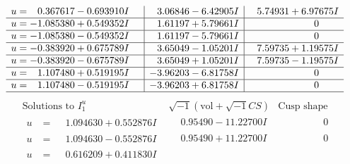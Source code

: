 \documentclass[1p]{elsarticle_modified}
\theoremstyle{definition}
\newcommand{\I}{\sqrt{-1}}
\begin{document}
$$\begin{array}{c|c|c}
\begin{aligned}
u &= \phantom{-}0.367617 - 0.693910 I\end{aligned}
 & \phantom{-}3.06846 - 6.42905 I & \phantom{-}5.74931 + 6.97675 I \\ \hline\begin{aligned}
u &= -1.085380 + 0.549352 I\end{aligned}
 & \phantom{-}1.61197 + 5.79661 I & \phantom{-0.000000 } 0 \\ \hline\begin{aligned}
u &= -1.085380 - 0.549352 I\end{aligned}
 & \phantom{-}1.61197 - 5.79661 I & \phantom{-0.000000 } 0 \\ \hline\begin{aligned}
u &= -0.383920 + 0.675789 I\end{aligned}
 & \phantom{-}3.65049 - 1.05201 I & \phantom{-}7.59735 + 1.19575 I \\ \hline\begin{aligned}
u &= -0.383920 - 0.675789 I\end{aligned}
 & \phantom{-}3.65049 + 1.05201 I & \phantom{-}7.59735 - 1.19575 I \\ \hline\begin{aligned}
u &= \phantom{-}1.107480 + 0.519195 I\end{aligned}
 & -3.96203 - 6.81758 I & \phantom{-0.000000 } 0 \\ \hline\begin{aligned}
u &= \phantom{-}1.107480 - 0.519195 I\end{aligned}
 & -3.96203 + 6.81758 I & \phantom{-0.000000 } 0\\
 \hline 
 \end{array}$$\newpage$$\begin{array}{c|c|c}  
\text{Solutions to }I^u_{1}& \I (\text{vol} + \sqrt{-1}CS) & \text{Cusp shape}\\
 \hline 
\begin{aligned}
u &= \phantom{-}1.094630 + 0.552876 I\end{aligned}
 & \phantom{-}0.95490 - 11.22700 I & \phantom{-0.000000 } 0 \\ \hline\begin{aligned}
u &= \phantom{-}1.094630 - 0.552876 I\end{aligned}
 & \phantom{-}0.95490 + 11.22700 I & \phantom{-0.000000 } 0 \\ \hline\begin{aligned}
u &= \phantom{-}0.616209 + 0.411830 I\end{aligned}

\end{array}$$
\end{document}
